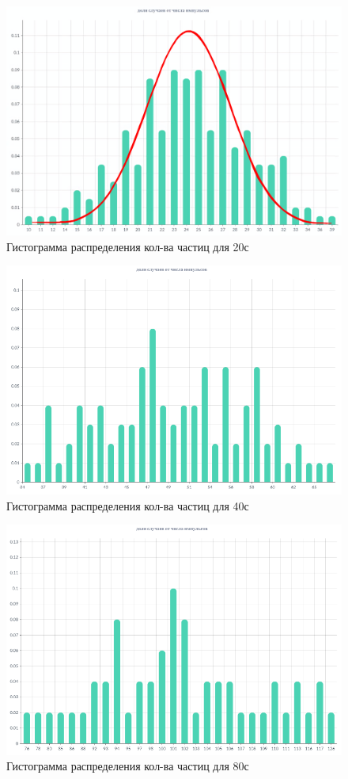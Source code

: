 \documentclass{article}
\begin{document}
\begin{figure}[t]
    \centering
    \includegraphics[width=0.65\linewidth]{Screenshot_4.png}
    \caption{Гистограмма распределения кол-ва частиц для 20с}
    \label{fig:enter-label}
\end{figure}

\begin{figure}[t]
    \centering
    \includegraphics[width=0.65\linewidth]{Screenshot_2.png}
    \caption{Гистограмма распределения кол-ва частиц для 40с}
    \label{fig:enter-label}
\end{figure}

\begin{figure}[t]
    \centering
    \includegraphics[width=0.65\linewidth]{Screenshot_1.png}
    \caption{Гистограмма распределения кол-ва частиц для 80с}
    \label{fig:enter-label}
\end{figure}
\end{document}

